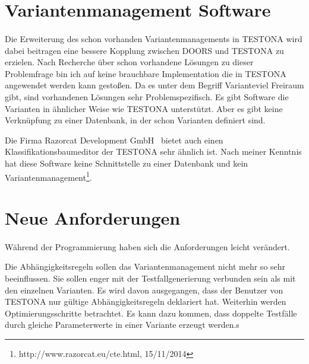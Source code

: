 \newpage
\section{Variantenmanagement Software}
\paragraph{}
Die Erweiterung des schon vorhanden Variantenmanagements in TESTONA wird dabei beitragen eine bessere Kopplung zwischen DOORS und TESTONA zu erzielen. Nach Recherche über schon vorhandene Lösungen zu dieser Problemfrage bin ich auf keine brauchbare Implementation die in TESTONA angewendet werden kann gestoßen. Da es unter dem Begriff \glqq Variante\grqq viel Freiraum gibt, sind vorhandenen Lösungen sehr Problemspezifisch. Es gibt Software die Varianten in ähnlicher Weise wie TESTONA unterstützt. Aber es gibt keine Verknüpfung zu einer Datenbank, in der  schon Varianten definiert sind.

Die Firma \glqq Razorcat Development GmbH\grqq~ bietet auch einen Klassifikationsbaumeditor der TESTONA sehr ähnlich ist. Nach meiner Kenntnis hat diese Software keine Schnittstelle zu einer Datenbank und kein Variantenmanagement\footnote{http://www.razorcat.eu/cte.html, 15/11/2014}.



\newpage
\section{Neue Anforderungen}
\paragraph{}
Während der Programmierung haben sich die Anforderungen leicht verändert.

Die Abhängigkeitsregeln sollen das Variantenmanagement nicht mehr so sehr beeinflussen. Sie  sollen  enger mit der Testfallgenerierung verbunden sein als mit den einzelnen Varianten. Es wird davon ausgegangen, dass der Benutzer von TESTONA nur gültige Abhängigkeitsregeln deklariert hat. Weiterhin werden Optimierungsschritte betrachtet. Es kann dazu kommen, dass doppelte Testfälle durch gleiche Parameterwerte in einer Variante erzeugt werden.s